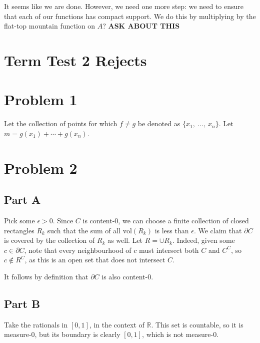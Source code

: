 \documentclass[10pt, oneside]{amsart}
\begin{document}
    It seems like we are done. However,
    we need one more step: we need to ensure that each of our functions has compact support. We do this by multiplying by the flat-top mountain function on $A$? \textbf{ASK ABOUT THIS}

    \hrulefill

    

    \newpage

    \section{Term Test 2 Rejects}

    \section{Problem 1}

    Let the collection of points for which $f \neq g$ be denoted as $\{x_1, \ ..., \ x_n\}$. Let $m = g(x_1) + \cdots + g(x_n)$. 

    \hrulefill

    \section{Problem 2}

    \subsection{Part A} Pick some $\epsilon > 0$. Since $C$ is content-$0$, we can choose a finite collection of closed rectangles $R_k$ such that the sum of all $\text{vol}(R_k)$ is less than $\epsilon$.
    We claim that $\partial C$ is covered by the collection of $R_k$ as well. Let $R = \cup R_k$. Indeed, given some $c \in \partial C$, note that every neighbourhood of $c$ must intersect both $C$ and $C^{C}$,
    so $c \notin R^{C}$, as this is an open set that does not intersect $C$.
    \newline

    It follows by definition that $\partial C$ is also content-$0$.

    \subsection{Part B} Take the rationals in $[0, 1]$, in the context of $\mathbb{R}$. This set is countable, so it is measure-$0$, but its boundary is clearly $[0, 1]$, which is not measure-$0$.

    \hrulefill
\end{document}
